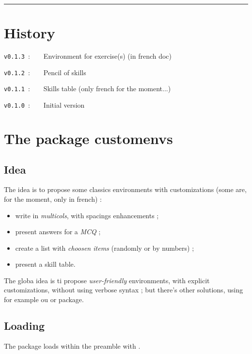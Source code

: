 \documentclass[english,11pt,a4paper]{article}
\begin{document}
\hrule

\vfill

\section{History}

\verb|v0.1.3|~:~~~~Environment for exercise(s) (in french doc)

\verb|v0.1.2|~:~~~~Pencil of skills

\verb|v0.1.1|~:~~~~Skills table (only french for the moment...)

\verb|v0.1.0|~:~~~~Initial version

\vspace*{5mm}

\pagebreak

\section{The package customenvs}

\subsection{Idea}

The idea is to propose some classics environments with customizations (some are, for the moment, only in french) :

\begin{itemize}
	\item write in \textit{multicols}, with spacings enhancements ;
	\item present answers for a \textit{MCQ} ;
	\item create a list with \textit{choosen items} (randomly or by numbers) ;
	\item present a skill table.
\end{itemize}

\smallskip

The globa idea is ti propose \textit{user-friendly} environments, with explicit customizations, without using verbose syntax ; but there's other solutions, using for example  ou  or  package.

\subsection{Loading}

The package loads within the preamble with .
\end{document}
